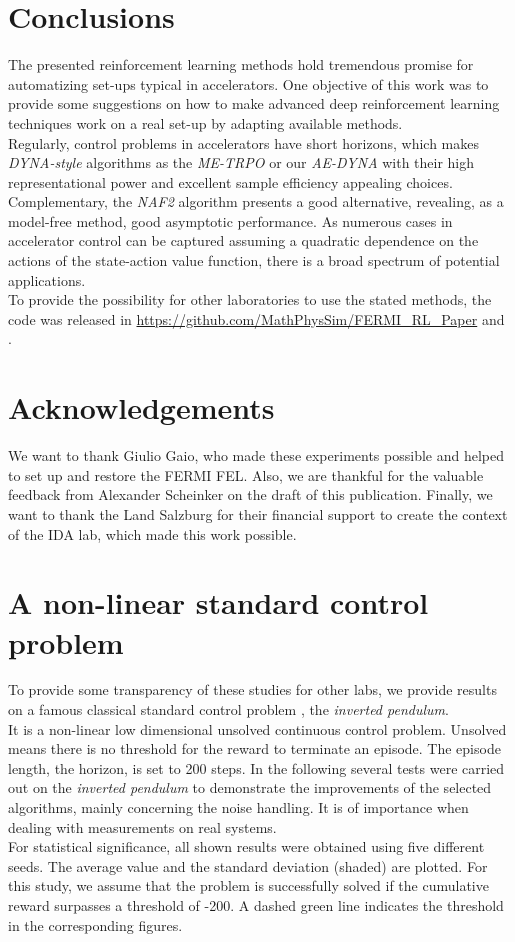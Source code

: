 \documentclass[
reprint,
amsmath,amssymb,amsfonts,clevref,
aps,
prstab,
]{revtex4-2}
\begin{document}
	\section{Conclusions}
	The presented reinforcement learning methods hold tremendous promise for automatizing set-ups typical in accelerators. One objective of this work was to provide some suggestions on how to make advanced deep reinforcement learning techniques work on a real set-up by adapting available methods.\\
	Regularly, control problems in accelerators have short horizons, which makes \emph{DYNA-style} algorithms as the \emph{ME-TRPO} or our \emph{AE-DYNA} with their high representational power and excellent sample efficiency appealing choices.\\
	Complementary, the \emph{NAF2} algorithm presents a good alternative, revealing, as a model-free method, good asymptotic performance. As numerous cases in accelerator control can be captured assuming a quadratic dependence on the actions of the state-action value function, there is a broad spectrum of potential applications.\\
	To provide the possibility for other laboratories to use the stated methods, the code was released in \url{https://github.com/MathPhysSim/FERMI_RL_Paper} and \cite{Hirlaender2020b}.
	
	\section{Acknowledgements}
	We want to thank Giulio Gaio, who made these experiments possible and helped to set up and restore the FERMI FEL. Also, we are thankful for the valuable feedback from Alexander Scheinker on the draft of this publication. Finally, we want to thank the Land Salzburg for their financial support to create the context of the IDA lab, which made this work possible.
	
	\appendix
	\section{A non-linear standard control problem}
	To provide some transparency of these studies for other labs, we provide results on a famous classical standard control problem \cite{Furutaa}, the \emph{inverted pendulum}.\\
	It is a non-linear low dimensional unsolved continuous control problem. Unsolved means there is no threshold for the reward to terminate an episode. The episode length, the horizon, is set to 200 steps. In the following several tests were carried out on the \emph{inverted pendulum} to demonstrate the improvements of the selected algorithms, mainly concerning the noise handling. It is of importance when dealing with measurements on real systems.\\
	For statistical significance, all shown results were obtained using five different seeds. The average value and the standard deviation (shaded) are plotted. For this study, we assume that the problem is successfully solved if the cumulative reward surpasses a threshold of -200. A dashed green line indicates the threshold in the corresponding figures.
	
\end{document}
